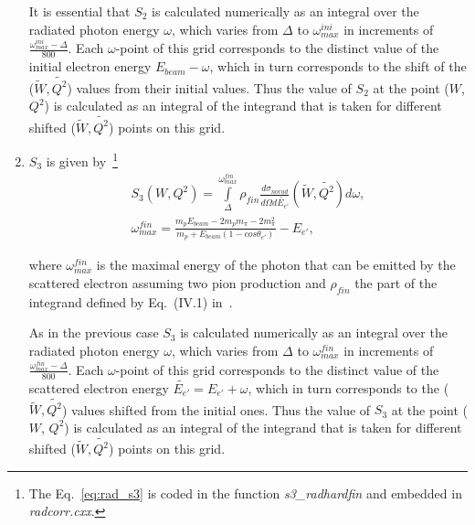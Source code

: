 \begin{enumerate}
It is essential that $S_2$ is calculated numerically as an integral over the radiated photon energy $\omega$, which varies from $\Delta$ to $\omega_{max}^{ini}$ in increments of $\frac{\omega_{max}^{ini}-\Delta}{800}$. Each $\omega$-point of this grid corresponds to the distinct value of the initial electron energy $E_{beam} - \omega$, which in turn corresponds to the shift of the ($\widetilde{W}, \widetilde{Q^{2}}$) values from their initial values. Thus the value of $S_2$ at the point ($W$, $Q^2$) is calculated as an integral of the integrand that is taken for different shifted ($\widetilde{W}, \widetilde{Q^{2}}$) points on this grid. 


\item $S_{3}$ is given by~\footnote[4]{The Eq.~\eqref{eq:rad_s3} is coded in the function {\em s3\_radhardfin} and embedded in {\em radcorr.cxx}.}
\begin{equation}
\begin{aligned}
S_{3}(W,Q^2) = \int\limits_{\Delta}^{\omega_{max}^{fin}}\rho_{fin}\frac{d\sigma_{norad}}{d\Omega  d\widetilde{E_{e'}}}(\widetilde{W},\widetilde{Q^{2}})d\omega, \\
\omega_{max}^{fin} = \frac{m_{p}E_{beam} - 2m_{p}m_{\pi} - 2m_{\pi}^2}{m_{p} + E_{beam}(1 - cos\theta_{e'})} - E_{e'},
\label{eq:rad_s3}
\end{aligned}
\end{equation}

where $\omega_{max}^{fin}$ is the maximal energy of the photon that can be emitted by the scattered electron assuming two pion production and $\rho_{fin}$  the part of the integrand defined by Eq.~(IV.1) in~\cite{Mo:1968cg}. 

As in the previous case $S_3$ is calculated numerically as an integral over the radiated photon energy $\omega$, which varies from $\Delta$ to $\omega_{max}^{fin}$ in increments of $\frac{\omega_{max}^{fin}-\Delta}{800}$. Each $\omega$-point of this grid corresponds to the distinct value of the scattered electron energy $\widetilde{E_{e'}} = E_{e'} + \omega$, which in turn corresponds to the ($\widetilde{W}, \widetilde{Q^{2}}$) values shifted from the initial ones. Thus the value of $S_3$ at the point ($W$, $Q^2$) is calculated as an integral of the integrand that is taken for different shifted ($\widetilde{W}, \widetilde{Q^{2}}$) points on this grid. 

\end{enumerate}

